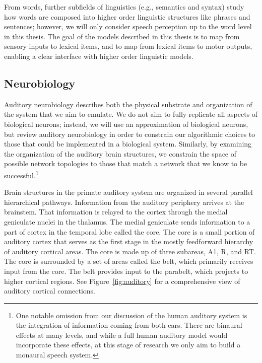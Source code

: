 From words,
further subfields of linguistics
(e.g., semantics and syntax)
study how words are composed
into higher order linguistic structures
like phrases and sentences;
however, we will only consider
speech perception up to the word level
in this thesis.
The goal of the models described in this thesis
is to map from sensory inputs
to lexical items,
and to map from lexical items to motor outputs,
enabling a clear interface with
higher order linguistic models.

\subsection{Neurobiology}
\label{sec:recog-neurobio}

Auditory neurobiology describes both
the physical substrate and organization
of the system that we aim to emulate.
We do not aim to fully replicate
all aspects of biological neurons;
instead, we will use an approximation
of biological neurons,
but review auditory neurobiology
in order to constrain our algorithmic choices
to those that could be implemented
in a biological system.
Similarly, by examining the organization
of the auditory brain structures,
we constrain the space of possible
network topologies
to those that match
a network that we know
to be successful.\footnote{One notable omission
  from our discussion
  of the human auditory system
  is the integration of information
  coming from both ears.
  There are binaural effects at many levels,
  and while a full human auditory model
  would incorporate these effects,
  at this stage of research
  we only aim to build
  a monaural speech system.}

Brain structures in the primate auditory system
are organized in several parallel
hierarchical pathways.
Information from the auditory periphery
arrives at the brainstem.
That information is relayed to the cortex
through the medial geniculate nuclei
in the thalamus.
The medial geniculate sends information to a part
of cortex in the temporal lobe
called the core.
The core is a small portion of auditory cortex
that serves as the first stage
in the mostly feedforward hierarchy
of auditory cortical areas.
The core is made up of
three subareas, A1, R, and RT.
The core is surrounded by a set of areas
called the belt,
which primarily receives input from
the core.
The belt provides input
to the parabelt,
which projects to higher cortical regions.
See Figure~\ref{fig:auditory}
for a comprehensive view
of auditory cortical connections.


